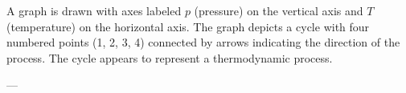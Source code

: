 A graph is drawn with axes labeled \( p \) (pressure) on the vertical axis and \( T \) (temperature) on the horizontal axis. The graph depicts a cycle with four numbered points (1, 2, 3, 4) connected by arrows indicating the direction of the process. The cycle appears to represent a thermodynamic process.

---